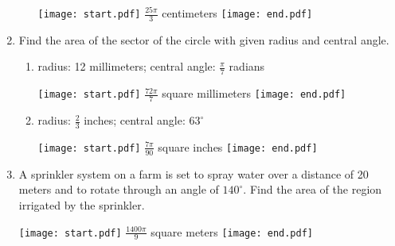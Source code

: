 \documentclass[12pt]{article}
\begin{document}
\begin{enumerate}
\begin{enumerate}
\texttt{[image: start.pdf]}
{$\displaystyle \frac{25\pi}{3}$ centimeters}
\texttt{[image: end.pdf]}


\end{enumerate}


\item Find the area of the sector of the circle with given radius and central angle.

\begin{enumerate}

\item radius: 12 millimeters; central angle: $\displaystyle \frac{\pi}{7}$ radians

\texttt{[image: start.pdf]}
{$\displaystyle \frac{72\pi}{7}$ square millimeters}
\texttt{[image: end.pdf]}


\item radius: $\displaystyle \frac{2}{3}$ inches; central angle: $63^{\circ}$

\texttt{[image: start.pdf]}
{$\displaystyle \frac{7\pi}{90}$ square inches}
\texttt{[image: end.pdf]}


\end{enumerate}

\item A sprinkler system on a farm is set to spray water over a distance of 20 meters and to rotate through an angle of $140^{\circ}$.  Find the area of the region irrigated by the sprinkler.

\texttt{[image: start.pdf]}
{$\displaystyle \frac{1400\pi}{9}$ square meters}
\texttt{[image: end.pdf]}



\end{enumerate}
\end{document}
